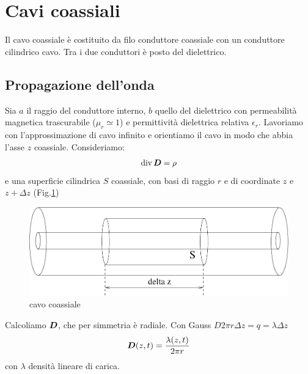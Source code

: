 \section{Cavi coassiali}
Il cavo coassiale è costituito da filo conduttore coassiale con un conduttore cilindrico cavo. Tra i due conduttori è posto del dielettrico.
\subsection{Propagazione dell'onda}
Sia $a$ il raggio del conduttore interno, $b$ quello del dielettrico con permeabilità magnetica trascurabile ($\mu_r\simeq 1$) e permittività dielettrica relativa $\epsilon_r$. Lavoriamo con l'approssimazione di cavo infinito e orientiamo il cavo in modo che abbia l'asse $z$ coassiale. Consideriamo:
\begin{equation}
\operatorname{div}\boldsymbol{D}=\rho
\end{equation}
e una superficie cilindrica $S$ coassiale, con basi di raggio $r$ e di coordinate $z$ e $z+\Delta z$ (Fig.\ref{coassiali_01})
\begin{figure}[htbp]
\centering
\includegraphics[scale=0.5]{immagini/fisica2/coassiali_01}
\caption{cavo coassiale}
\label{coassiali_01}
\end{figure}
Calcoliamo $\boldsymbol{D}$, che per simmetria è radiale. Con Gauss $D2\pi r\Delta z=q=\lambda\Delta z$
\begin{equation}
\boldsymbol{D}(z,t)=\frac{\lambda(z,t)}{2\pi r}
\label{lambda_coa}
\end{equation}
con $\lambda$ densità lineare di carica.

